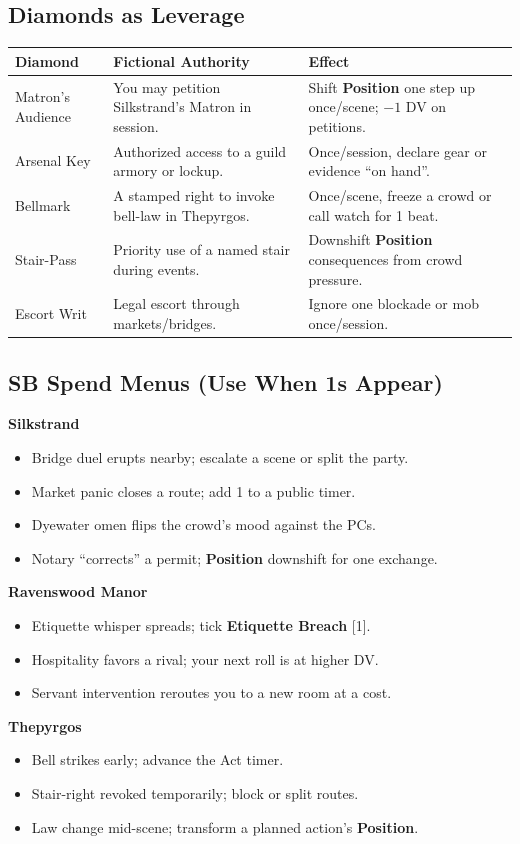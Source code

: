 \documentclass[11pt]{article}
\newcommand{\Clock}[2]{\textbf{#1} [#2]}
\newcommand{\Term}[1]{\textbf{#1}}
\newcommand{\Position}{\Term{Position}}
\begin{document}
\subsection*{Diamonds as Leverage}
\begin{tabularx}{\linewidth}{@{}l X l@{}}
\toprule
\textbf{Diamond} & \textbf{Fictional Authority} & \textbf{Effect}\\
\midrule
Matron's Audience & You may petition Silkstrand's Matron in session. & Shift \Position{} one step up once/scene; \(-1\) DV on petitions.\\
Arsenal Key & Authorized access to a guild armory or lockup. & Once/session, declare gear or evidence ``on hand''.\\
Bellmark & A stamped right to invoke bell-law in Thepyrgos. & Once/scene, freeze a crowd or call watch for 1 beat.\\
Stair-Pass & Priority use of a named stair during events. & Downshift \Position{} consequences from crowd pressure.\\
Escort Writ & Legal escort through markets/bridges. & Ignore one blockade or mob once/session.\\
\bottomrule
\end{tabularx}

\subsection*{SB Spend Menus (Use When 1s Appear)}
\noindent\textbf{Silkstrand}
\begin{itemize}
\item Bridge duel erupts nearby; escalate a scene or split the party.
\item Market panic closes a route; add 1 to a public timer.
\item Dyewater omen flips the crowd's mood against the PCs.
\item Notary ``corrects'' a permit; \Position{} downshift for one exchange.
\end{itemize}
\noindent\textbf{Ravenswood Manor}
\begin{itemize}
\item Etiquette whisper spreads; tick \Clock{Etiquette Breach}{1}.
\item Hospitality favors a rival; your next roll is at higher DV.
\item Servant intervention reroutes you to a new room at a cost.
\end{itemize}
\noindent\textbf{Thepyrgos}
\begin{itemize}
\item Bell strikes early; advance the Act timer.
\item Stair-right revoked temporarily; block or split routes.
\item Law change mid-scene; transform a planned action's \Position{}.
\end{itemize}
\end{document}
